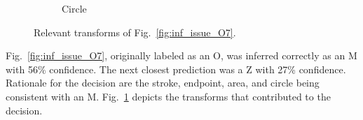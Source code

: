 \documentclass[conference]{IEEEtran}
\begin{document}
\begin{figure}[h]
\begin{subfigure}{.20\columnwidth}
        \caption{Circle}
    \end{subfigure}%
    \caption{Relevant transforms of Fig.~\ref{fig:inf_issue_O7}.}
    \label{fig:o7_trans}
\end{figure}

Fig.~\ref{fig:inf_issue_O7}, originally labeled as an O, was inferred correctly
as an M with 56\% confidence. The next closest prediction was a Z with 27\%
confidence.  Rationale for the decision are the stroke, endpoint, area,
and circle being consistent with an M. Fig.~\ref{fig:o7_trans} depicts the
transforms that contributed to the decision.
\end{document}

